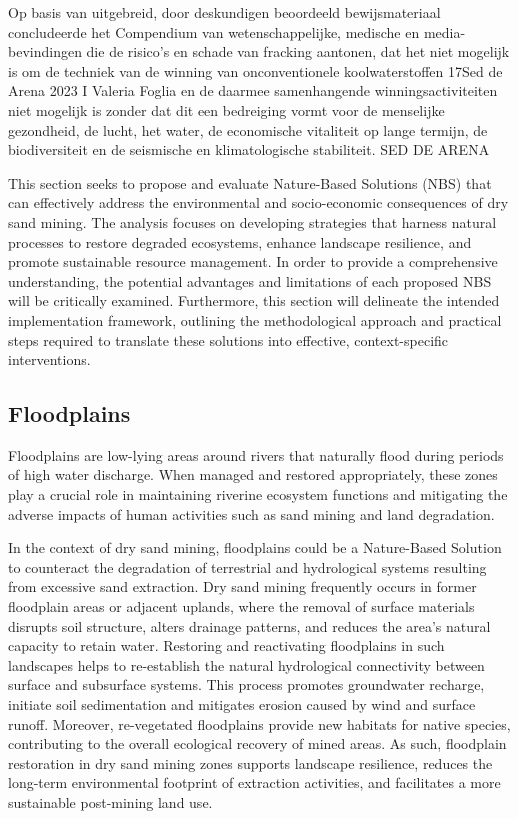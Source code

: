 Op basis van uitgebreid, door deskundigen beoordeeld bewijsmateriaal concludeerde het Compendium van wetenschappelijke, medische en media-bevindingen die de risico's en schade van fracking aantonen, dat het niet mogelijk is om de techniek van de winning van onconventionele koolwaterstoffen 17Sed de Arena 2023 I Valeria Foglia en de daarmee samenhangende winningsactiviteiten niet mogelijk is zonder dat dit een bedreiging vormt voor de menselijke gezondheid, de lucht, het water, de economische vitaliteit op lange termijn, de biodiversiteit en de seismische en klimatologische stabiliteit. SED DE ARENA

This section seeks to propose and evaluate Nature-Based Solutions (NBS) that can effectively address the environmental and socio-economic consequences of dry sand mining. The analysis focuses on developing strategies that harness natural processes to restore degraded ecosystems, enhance landscape resilience, and promote sustainable resource management. In order to provide a comprehensive understanding, the potential advantages and limitations of each proposed NBS will be critically examined. Furthermore, this section will delineate the intended implementation framework, outlining the methodological approach and practical steps required to translate these solutions into effective, context-specific interventions.

\subsection{Floodplains}

Floodplains are low-lying areas around rivers that naturally flood during periods of high water discharge. When managed and restored appropriately, these zones play a crucial role in maintaining riverine ecosystem functions and mitigating the adverse impacts of human activities such as sand mining and land degradation.

In the context of dry sand mining, floodplains could be a Nature-Based Solution to counteract the degradation of terrestrial and hydrological systems resulting from excessive sand extraction. Dry sand mining frequently occurs in former floodplain areas or adjacent uplands, where the removal of surface materials disrupts soil structure, alters drainage patterns, and reduces the area’s natural capacity to retain water. Restoring and reactivating floodplains in such landscapes helps to re-establish the natural hydrological connectivity between surface and subsurface systems. This process promotes groundwater recharge, initiate soil sedimentation and mitigates erosion caused by wind and surface runoff. Moreover, re-vegetated floodplains provide new habitats for native species, contributing to the overall ecological recovery of mined areas. As such, floodplain restoration in dry sand mining zones supports landscape resilience, reduces the long-term environmental footprint of extraction activities, and facilitates a more sustainable post-mining land use.

